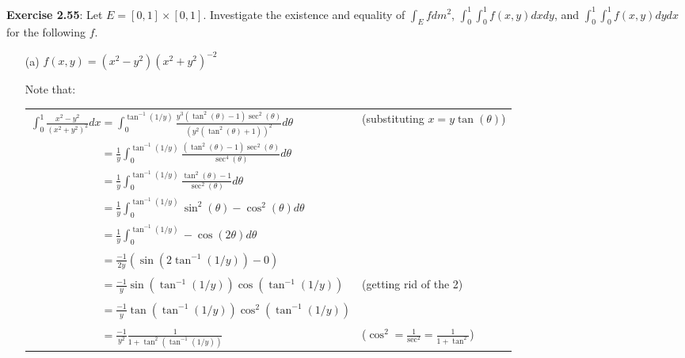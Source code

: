 \documentclass{book}
\newcommand{\exTwoP}{%
   \color{RedViolet}%
   \fontsize{13}{15}\selectfont%
}
\newcommand{\exPPP}{%
   \color{VioletRed}%
   \fontsize{12}{14}\selectfont%
}
\newenvironment{myIndent}{%
   \begin{adjustwidth}{2.5em}{0em}%
}{%
   \end{adjustwidth}%
}
\newcommand{\blab}[1]{\textbf{#1}}
\begin{document}
\blab{Exercise 2.55}: Let $E = [0, 1] \times [0, 1]$. Investigate the existence and equality of $\int_E fdm^2$, $\int_0^1 \int_0^1 f(x, y)dxdy$, and $\int_0^1 \int_0^1 f(x, y)dydx$ for the following $f$.
\begin{enumerate}
	\item[(a)] $f(x, y) = (x^2 - y^2)(x^2 + y^2)^{-2}$

	\begin{myIndent}\exTwoP
		Note that:

		{\centering 
		\begin{tabular}{l l}
			$\int_0^1 \frac{x^2 - y^2}{(x^2 + y^2)^2}dx = \int_0^{\tan^{-1}(1/y)} \frac{y^3(\tan^2(\theta) - 1)\sec^2(\theta)}{(y^2(\tan^2(\theta) + 1))^2}d\theta$ & {\exPPP (substituting $x = y\tan(\theta)$)} \\ [8pt]

			$\phantom{\int_0^1 \frac{x^2 - y^2}{(x^2 + y^2)^2}dx} = \frac{1}{y}\int_0^{\tan^{-1}(1/y)} \frac{(\tan^2(\theta) - 1)\sec^2(\theta)}{\sec^4(\theta)}d\theta$\\ [8pt]

			$\phantom{\int_0^1 \frac{x^2 - y^2}{(x^2 + y^2)^2}dx} = \frac{1}{y}\int_0^{\tan^{-1}(1/y)} \frac{\tan^2(\theta) - 1}{\sec^2(\theta)}d\theta$\\ [8pt]

			$\phantom{\int_0^1 \frac{x^2 - y^2}{(x^2 + y^2)^2}dx} = \frac{1}{y}\int_0^{\tan^{-1}(1/y)} \sin^2(\theta) - \cos^2(\theta)d\theta$\\ [8pt]

			$\phantom{\int_0^1 \frac{x^2 - y^2}{(x^2 + y^2)^2}dx} = \frac{1}{y}\int_0^{\tan^{-1}(1/y)} -\cos(2\theta)d\theta$\\ [8pt]
			
			$\phantom{\int_0^1 \frac{x^2 - y^2}{(x^2 + y^2)^2}dx} = \frac{-1}{2y}(\sin(2\tan^{-1}(1/y)) - 0)$\\ [8pt]

			$\phantom{\int_0^1 \frac{x^2 - y^2}{(x^2 + y^2)^2}dx} = \frac{-1}{y}\sin(\tan^{-1}(1/y))\cos(\tan^{-1}(1/y))$ & {\exPPP (getting rid of the 2)}\\ [8pt]

			$\phantom{\int_0^1 \frac{x^2 - y^2}{(x^2 + y^2)^2}dx} = \frac{-1}{y}\tan(\tan^{-1}(1/y))\cos^2(\tan^{-1}(1/y))$\\ [8pt]

			$\phantom{\int_0^1 \frac{x^2 - y^2}{(x^2 + y^2)^2}dx} = \frac{-1}{y^2}\frac{1}{1 + \tan^2(\tan^{-1}(1/y))}$ & {\exPPP ($\cos^2 = \frac{1}{\sec^2} = \frac{1}{1 + \tan^2}$)}\\ [8pt]


\end{tabular}}
\end{myIndent}
\end{enumerate}
\end{document}
